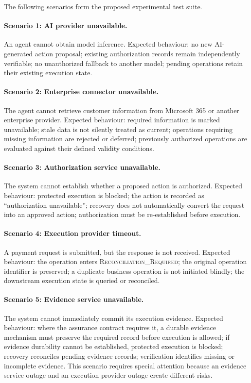 \documentclass[11pt,a4paper]{article}
\begin{document}
The following scenarios form the proposed experimental test suite.

\paragraph{Scenario 1: AI provider unavailable.} An agent cannot obtain model inference. Expected behaviour: no new AI-generated action proposal; existing authorization records remain independently verifiable; no unauthorized fallback to another model; pending operations retain their existing execution state.

\paragraph{Scenario 2: Enterprise connector unavailable.} The agent cannot retrieve customer information from Microsoft 365 or another enterprise provider. Expected behaviour: required information is marked unavailable; stale data is not silently treated as current; operations requiring missing information are rejected or deferred; previously authorized operations are evaluated against their defined validity conditions.

\paragraph{Scenario 3: Authorization service unavailable.} The system cannot establish whether a proposed action is authorized. Expected behaviour: protected execution is blocked; the action is recorded as ``authorization unavailable''; recovery does not automatically convert the request into an approved action; authorization must be re-established before execution.

\paragraph{Scenario 4: Execution provider timeout.} A payment request is submitted, but the response is not received. Expected behaviour: the operation enters \textsc{Reconciliation\_Required}; the original operation identifier is preserved; a duplicate business operation is not initiated blindly; the downstream execution state is queried or reconciled.

\paragraph{Scenario 5: Evidence service unavailable.} The system cannot immediately commit its execution evidence. Expected behaviour: where the assurance contract requires it, a durable evidence mechanism must preserve the required record before execution is allowed; if evidence durability cannot be established, protected execution is blocked; recovery reconciles pending evidence records; verification identifies missing or incomplete evidence. This scenario requires special attention because an evidence service outage and an execution provider outage create different risks.
\end{document}
